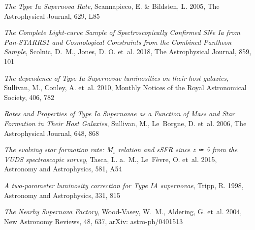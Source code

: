 \documentclass[a4paper, 12pt, svgnames]{article}
\begin{document}
\begin{thebibliography}{23}
{\em The {Type} {Ia} {Supernova} {Rate}}, Scannapieco, E. \& Bildsten, L. 2005,
The Astrophysical Journal, 629, L85

{\em The {Complete} {Light}-curve {Sample} of {Spectroscopically} {Confirmed}
{SNe} {Ia} from {Pan}-{STARRS}1 and {Cosmological} {Constraints} from the
{Combined} {Pantheon} {Sample}}, Scolnic, D.~M., Jones, D. O. et~al. 2018, The
Astrophysical Journal, 859, 101

{\em The dependence of {Type} {Ia} {Supernovae} luminosities on their host
galaxies}, Sullivan, M., Conley, A. et~al. 2010, Monthly Notices of the Royal
Astronomical Society, 406, 782

{\em Rates and {Properties} of {Type} {Ia} {Supernovae} as a {Function} of
{Mass} and {Star} {Formation} in {Their} {Host} {Galaxies}}, Sullivan, M.,
Le~Borgne, D. et~al. 2006, The Astrophysical Journal, 648, 868

{\em The evolving star formation rate: {M}$_\star$ relation and {sSFR} since z ≃
5 from the {VUDS} spectroscopic survey}, Tasca, L. a.~M., Le~Fèvre, O. et~al.
2015, Astronomy and Astrophysics, 581, A54

{\em A two-parameter luminosity correction for {Type} {IA} supernovae}, Tripp,
R. 1998, Astronomy and Astrophysics, 331, 815

{\em The {Nearby} {Supernova} {Factory}}, Wood-Vasey, W.~M., Aldering, G. et~al.
2004, New Astronomy Reviews, 48, 637, arXiv: astro-ph/0401513

\end{thebibliography}
\end{document}
